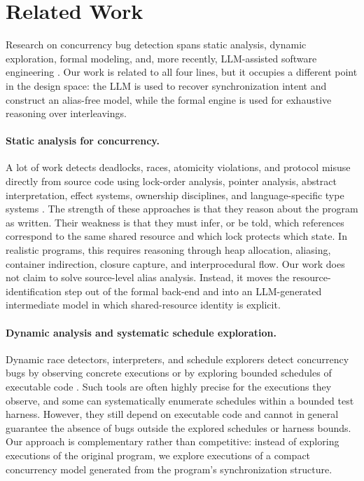 \documentclass[sigconf]{acmart}
\begin{document}
\section{Related Work}
\label{sec:related}

Research on concurrency bug detection spans static analysis, dynamic exploration, formal modeling, and, more recently, LLM-assisted software engineering \cite{Engler2003RacerX,Godefroid1997VeriSoft,Murata1989PetriNets,Fan2023RepairFromLLMs,Xia2023APRLLMs}. Our work is related to all four lines, but it occupies a different point in the design space: the LLM is used to recover synchronization intent and construct an alias-free model, while the formal engine is used for exhaustive reasoning over interleavings.

\paragraph{Static analysis for concurrency.}
A lot of work detects deadlocks, races, atomicity violations, and protocol misuse directly from source code using lock-order analysis, pointer analysis, abstract interpretation, effect systems, ownership disciplines, and language-specific type systems \cite{Engler2003RacerX,Flanagan2000TypeBasedRace,Flanagan2003Atomicity,Boyapati2002Ownership,Pratikakis2006Locksmith,Naik2006StaticRaceJava}. The strength of these approaches is that they reason about the program as written. Their weakness is that they must infer, or be told, which references correspond to the same shared resource and which lock protects which state. In realistic programs, this requires reasoning through heap allocation, aliasing, container indirection, closure capture, and interprocedural flow. Our work does not claim to solve source-level alias analysis. Instead, it moves the resource-identification step out of the formal back-end and into an LLM-generated intermediate model in which shared-resource identity is explicit.

\paragraph{Dynamic analysis and systematic schedule exploration.}
Dynamic race detectors, interpreters, and schedule explorers detect concurrency bugs by observing concrete executions or by exploring bounded schedules of executable code \cite{Godefroid1997VeriSoft,Flanagan2005DPOR,Musuvathi2008FairStateless,Musuvathi2008Heisenbugs,Burckhardt2010RandomizedScheduler}. Such tools are often highly precise for the executions they observe, and some can systematically enumerate schedules within a bounded test harness. However, they still depend on executable code and cannot in general guarantee the absence of bugs outside the explored schedules or harness bounds. Our approach is complementary rather than competitive: instead of exploring executions of the original program, we explore executions of a compact concurrency model generated from the program's synchronization structure.
\end{document}
